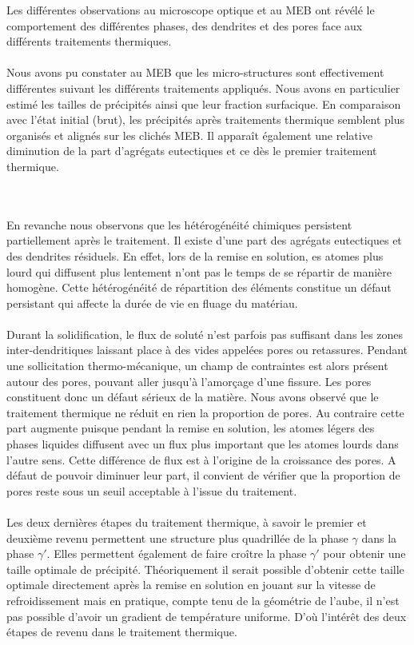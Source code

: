 Les différentes observations au microscope optique et au MEB ont révélé le comportement des différentes 
phases, des dendrites et des pores face aux différents traitements thermiques. 
\\
\\
Nous avons pu constater au MEB que les micro-structures sont effectivement différentes suivant les différents 
traitements appliqués. Nous avons en particulier estimé les tailles de précipités ainsi que leur fraction 
surfacique. En comparaison avec l’état initial (brut), les précipités après traitements thermique semblent 
plus organisés et alignés sur les clichés MEB. Il apparaît également une relative diminution de la part 
d'agrégats eutectiques et ce dès le premier traitement thermique.

\\
\\

En revanche nous observons que les hétérogénéité chimiques persistent partiellement après le traitement. Il 
existe d'une part des agrégats eutectiques et des dendrites résiduels. En effet, lors de la remise en 
solution, es atomes plus lourd qui diffusent plus lentement n’ont pas le temps de se répartir de manière 
homogène. Cette hétérogénéité de répartition des éléments constitue un défaut persistant qui affecte la durée 
de vie en fluage du matériau. 
\\
\\

Durant la solidification, le flux de soluté n’est parfois pas suffisant dans les zones inter-dendritiques 
laissant place à des vides appelées pores ou retassures. Pendant une sollicitation thermo-mécanique, un champ 
de contraintes est alors présent autour des pores, pouvant aller jusqu’à l’amorçage d’une fissure. Les pores 
constituent donc un défaut sérieux de la matière. Nous avons observé que le traitement thermique ne réduit en 
rien la proportion de pores. Au contraire cette part augmente puisque pendant la remise en solution, les 
atomes légers des phases liquides diffusent avec un flux plus important que les atomes lourds dans l'autre 
sens. Cette différence de flux est à l'origine de la croissance des pores. A défaut de pouvoir diminuer leur 
part, il convient de vérifier que la proportion de pores reste sous un seuil acceptable à l'issue du 
traitement.
\\
\\


Les deux dernières étapes du traitement thermique, à savoir le premier et deuxième revenu permettent une 
structure plus quadrillée de la phase $\gamma$ dans la phase $\gamma'$. Elles permettent également de faire 
croître la phase $\gamma'$ pour obtenir une taille optimale de précipité. Théoriquement il serait possible 
d'obtenir cette taille optimale directement après la remise en solution en jouant sur la vitesse de 
refroidissement mais en pratique, compte tenu de la géométrie de l'aube, il n'est pas possible d'avoir un 
gradient de température uniforme. D'où l'intérêt des deux étapes de revenu dans le traitement thermique.
\\
\\